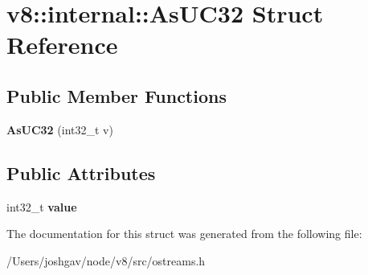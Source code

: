 \hypertarget{structv8_1_1internal_1_1_as_u_c32}{}\section{v8\+:\+:internal\+:\+:As\+U\+C32 Struct Reference}
\label{structv8_1_1internal_1_1_as_u_c32}
\subsection*{Public Member Functions}
\begin{DoxyCompactItemize}
\item 
{\bfseries As\+U\+C32} (int32\+\_\+t v)\hypertarget{structv8_1_1internal_1_1_as_u_c32_a55d751a53e563cf5c80f7e9f65c784bc}{}\label{structv8_1_1internal_1_1_as_u_c32_a55d751a53e563cf5c80f7e9f65c784bc}

\end{DoxyCompactItemize}
\subsection*{Public Attributes}
\begin{DoxyCompactItemize}
\item 
int32\+\_\+t {\bfseries value}\hypertarget{structv8_1_1internal_1_1_as_u_c32_a88d3f2de1bdd0a8b848e2f0a9f0557df}{}\label{structv8_1_1internal_1_1_as_u_c32_a88d3f2de1bdd0a8b848e2f0a9f0557df}

\end{DoxyCompactItemize}


The documentation for this struct was generated from the following file\+:\begin{DoxyCompactItemize}
\item 
/\+Users/joshgav/node/v8/src/ostreams.\+h\end{DoxyCompactItemize}
